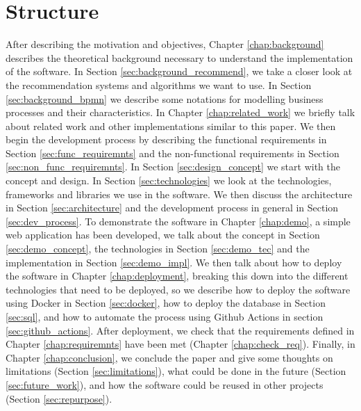 \section{Structure}

After describing the motivation and objectives, Chapter \ref{chap:background} describes the theoretical background necessary to understand the implementation of the software. In Section \ref{sec:background_recommend}, we take a closer look at the recommendation systems and algorithms we want to use. In Section \ref{sec:background_bpmn} we describe some notations for modelling business processes and their characteristics. 
In Chapter \ref{chap:related_work} we briefly talk about related work and other implementations similar to this paper. 
We then begin the development process by describing the functional requirements in Section \ref{sec:func_requiremnts} and the non-functional requirements in Section  \ref{sec:non_func_requiremnts}.
In Section \ref{sec:design_concept} we start with the concept and design. In Section \ref{sec:technologies} we look at the technologies, frameworks and libraries we use in the software. We then discuss the architecture in Section \ref{sec:architecture} and the development process in general in Section \ref{sec:dev_process}. 
To demonstrate the software in Chapter \ref{chap:demo}, a simple web application has been developed, we talk about the concept in Section \ref{sec:demo_concept}, the technologies in Section \ref{sec:demo_tec} and the implementation in Section \ref{sec:demo_impl}. 
We then talk about how to deploy the software in Chapter \ref{chap:deployment}, breaking this down into the different technologies that need to be deployed, so we describe how to deploy the software using Docker in Section \ref{sec:docker}, how to deploy the database in Section \ref{sec:sql}, and how to automate the process using Github Actions in section \ref{sec:github_actions}. 
After deployment, we check that the requirements defined in Chapter \ref{chap:requiremnts} have been met (Chapter \ref{chap:check_req}). 
Finally, in Chapter \ref{chap:conclusion}, we conclude the paper and give some thoughts on limitations (Section \ref{sec:limitations}), what could be done in the future (Section \ref{sec:future_work}), and how the software could be reused in other projects (Section \ref{sec:repurpose}).